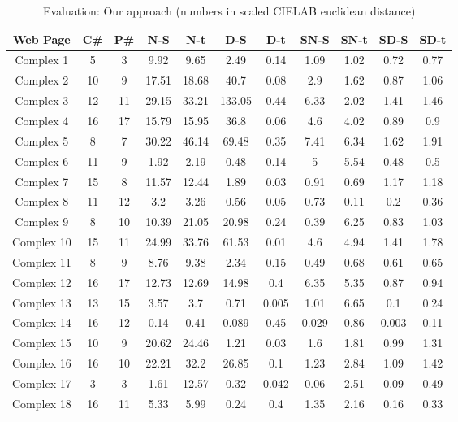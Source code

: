 \begin{table}[!htb]
\caption{Evaluation: Our approach (numbers in scaled CIELAB euclidean distance)}
\centering
\begin{tabular}{c c c c c c c c c c c}
\hline\hline
Web Page & C\# & P\# & N-S & N-t & D-S & D-t & SN-S & SN-t & SD-S & SD-t\\ [0.5ex]
\hline
Complex 1&5&3&9.92&9.65&2.49&0.14&1.09&1.02&0.72&0.77\\
Complex 2&10&9&17.51&18.68&40.7&0.08&2.9&1.62&0.87&1.06\\
Complex 3&12&11&29.15&33.21&133.05&0.44&6.33&2.02&1.41&1.46\\
Complex 4&16&17&15.79&15.95&36.8&0.06&4.6&4.02&0.89&0.9\\
Complex 5&8&7&30.22&46.14&69.48&0.35&7.41&6.34&1.62&1.91\\
Complex 6&11&9&1.92&2.19&0.48&0.14&5&5.54&0.48&0.5\\
Complex 7&15&8&11.57&12.44&1.89&0.03&0.91&0.69&1.17&1.18\\
Complex 8&11&12&3.2&3.26&0.56&0.05&0.73&0.11&0.2&0.36\\
Complex 9&8&10&10.39&21.05&20.98&0.24&0.39&6.25&0.83&1.03\\
Complex 10&15&11&24.99&33.76&61.53&0.01&4.6&4.94&1.41&1.78\\
Complex 11&8&9&8.76&9.38&2.34&0.15&0.49&0.68&0.61&0.65\\
Complex 12&16&17&12.73&12.69&14.98&0.4&6.35&5.35&0.87&0.94\\
Complex 13&13&15&3.57&3.7&0.71&0.005&1.01&6.65&0.1&0.24\\
Complex 14&16&12&0.14&0.41&0.089&0.45&0.029&0.86&0.003&0.11\\
Complex 15&10&9&20.62&24.46&1.21&0.03&1.6&1.81&0.99&1.31\\
Complex 16&16&10&22.21&32.2&26.85&0.1&1.23&2.84&1.09&1.42\\
Complex 17&3&3&1.61&12.57&0.32&0.042&0.06&2.51&0.09&0.49\\
Complex 18&16&11&5.33&5.99&0.24&0.4&1.35&2.16&0.16&0.33\\[1ex]
\hline
\end{tabular}
\label{table:nonlin}
\end{table}

